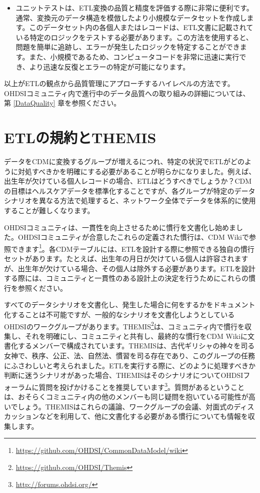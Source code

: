 \documentclass[
  11pt]{book}
\providecommand{\tightlist}{%
  \setlength{\itemsep}{0pt}\setlength{\parskip}{0pt}}
\theoremstyle{definition}
\theoremstyle{definition}
\theoremstyle{definition}
\theoremstyle{definition}
\theoremstyle{remark}
\begin{document}
\begin{itemize}
  \begin{itemize}
  \tightlist
  \item
    ユニットテストは、ETL変換の品質と精度を評価する際に非常に便利です。通常、変換元のデータ構造を模倣したより小規模なデータセットを作成します。このデータセット内の各個人またはレコードは、ETL文書に記載されている特定のロジックをテストする必要があります。この方法を使用すると、問題を簡単に追跡し、エラーが発生したロジックを特定することができます。また、小規模であるため、コンピュータコードを非常に迅速に実行でき、より迅速な反復とエラーの特定が可能になります。
  \end{itemize}
\end{itemize}

以上がETLの観点から品質管理にアプローチするハイレベルの方法です。OHDSIコミュニティ内で進行中のデータ品質への取り組みの詳細については、第 \ref{DataQuality} 章を参照ください。

\section{ETLの規約とTHEMIS}\label{etlux306eux898fux7d04ux3068themis}

データをCDMに変換するグループが増えるにつれ、特定の状況でETLがどのように対処すべきかを明確にする必要があることが明らかになりました。例えば、出生年が欠けている個人レコードの場合、ETLはどうすべきでしょうか？CDMの目標はヘルスケアデータを標準化することですが、各グループが特定のデータシナリオを異なる方法で処理すると、ネットワーク全体でデータを体系的に使用することが難しくなります。

OHDSIコミュニティは、一貫性を向上させるために慣行を文書化し始めました。OHDSIコミュニティが合意したこれらの定義された慣行は、CDM Wikiで参照できます\footnote{\url{https://github.com/OHDSI/CommonDataModel/wiki}}。各CDMテーブルには、ETLを設計する際に参照できる独自の慣行セットがあります。たとえば、出生年の月日が欠けている個人は許容されますが、出生年が欠けている場合、その個人は除外する必要があります。ETLを設計する際には、コミュニティと一貫性のある設計上の決定を行うためにこれらの慣行を参照ください。

すべてのデータシナリオを文書化し、発生した場合に何をするかをドキュメント化することは不可能ですが、一般的なシナリオを文書化しようとしているOHDSIのワークグループがあります。THEMIS\footnote{\url{https://github.com/OHDSI/Themis}}は、コミュニティ内で慣行を収集し、それを明確にし、コミュニティと共有し、最終的な慣行をCDM Wikiに文書化するメンバーで構成されています。THEMISは、古代ギリシャの神々を司る女神で、秩序、公正、法、自然法、慣習を司る存在であり、このグループの任務にふさわしいと考えられました。ETLを実行する際に、どのように処理すべきか判断に迷うシナリオがあった場合、THEMISはそのシナリオについてOHDSIフォーラムに質問を投げかけることを推奨しています\footnote{\url{http://forums.ohdsi.org/}}。質問があるということは、おそらくコミュニティ内の他のメンバーも同じ疑問を抱いている可能性が高いでしょう。THEMISはこれらの議論、ワークグループの会議、対面式のディスカッションなどを利用して、他に文書化する必要がある慣行についても情報を収集します。
\end{document}
